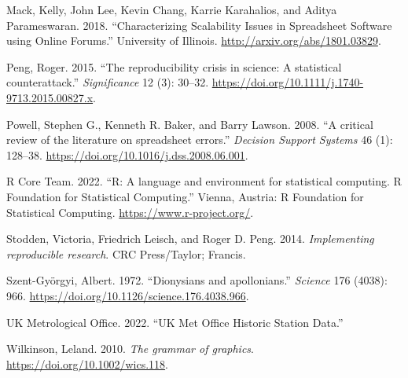 \documentclass[smallextended]{svjour3}       %
\newlength{\cslhangindent}
\newlength{\cslentryspacingunit} %
\newenvironment{CSLReferences}[2] %
 {%
  \setlength{\parindent}{0pt}
  \ifodd #1
  \let\oldpar\par
  \def\par{\hangindent=\cslhangindent\oldpar}
  \fi
  \setlength{\parskip}{#2\cslentryspacingunit}
 }%
 {}
\begin{document}
\begin{CSLReferences}{1}{0}
\leavevmode{}%
Mack, Kelly, John Lee, Kevin Chang, Karrie Karahalios, and Aditya Parameswaran. 2018. {``{Characterizing Scalability Issues in Spreadsheet Software using Online Forums}.''} University of Illinois. \url{http://arxiv.org/abs/1801.03829}.

\leavevmode{}%
Peng, Roger. 2015. {``{The reproducibility crisis in science: A statistical counterattack}.''} \emph{Significance} 12 (3): 30--32. \url{https://doi.org/10.1111/j.1740-9713.2015.00827.x}.

\leavevmode{}%
Powell, Stephen G., Kenneth R. Baker, and Barry Lawson. 2008. {``{A critical review of the literature on spreadsheet errors}.''} \emph{Decision Support Systems} 46 (1): 128--38. \url{https://doi.org/10.1016/j.dss.2008.06.001}.

\leavevmode{}%
R Core Team. 2022. {``{R: A language and environment for statistical computing. R Foundation for Statistical Computing}.''} Vienna, Austria: R Foundation for Statistical Computing. \url{https://www.r-project.org/}.

\leavevmode{}%
Stodden, Victoria, Friedrich Leisch, and Roger D. Peng. 2014. \emph{{Implementing reproducible research}}. CRC Press/Taylor; Francis.

\leavevmode{}%
Szent-Györgyi, Albert. 1972. {``{Dionysians and apollonians}.''} \emph{Science} 176 (4038): 966. \url{https://doi.org/10.1126/science.176.4038.966}.

\leavevmode{}%
UK Metrological Office. 2022. {``{UK Met Office Historic Station Data}.''}

\leavevmode{}%
Wilkinson, Leland. 2010. \emph{{The grammar of graphics}}. \url{https://doi.org/10.1002/wics.118}.

\end{CSLReferences}




\end{document}
